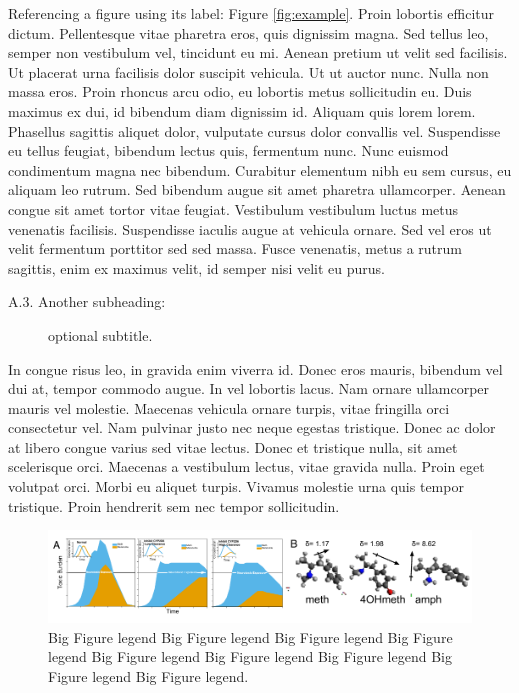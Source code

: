 \documentclass[11pt, notitlepage]{article} %
\begin{document}
Referencing a figure using its label: Figure \ref{fig:example}. Proin lobortis efficitur dictum. Pellentesque vitae pharetra eros, quis dignissim magna. Sed tellus leo, semper non vestibulum vel, tincidunt eu mi. Aenean pretium ut velit sed facilisis. Ut placerat urna facilisis dolor suscipit vehicula. Ut ut auctor nunc. Nulla non massa eros. Proin rhoncus arcu odio, eu lobortis metus sollicitudin eu. Duis maximus ex dui, id bibendum diam dignissim id. Aliquam quis lorem lorem. Phasellus sagittis aliquet dolor, vulputate cursus dolor convallis vel. Suspendisse eu tellus feugiat, bibendum lectus quis, fermentum nunc. Nunc euismod condimentum magna nec bibendum. Curabitur elementum nibh eu sem cursus, eu aliquam leo rutrum. Sed bibendum augue sit amet pharetra ullamcorper. Aenean congue sit amet tortor vitae feugiat. Vestibulum vestibulum luctus metus venenatis facilisis. Suspendisse iaculis augue at vehicula ornare. Sed vel eros ut velit fermentum porttitor sed sed massa. Fusce venenatis, metus a rutrum sagittis, enim ex maximus velit, id semper nisi velit eu purus.

\begin{description}
	\item[A.3. Another subheading:]{optional subtitle.}
\end{description}

In congue risus leo, in gravida enim viverra id. Donec eros mauris, bibendum vel dui at, tempor commodo augue. In vel lobortis lacus. Nam ornare ullamcorper mauris vel molestie. Maecenas vehicula ornare turpis, vitae fringilla orci consectetur vel. Nam pulvinar justo nec neque egestas tristique. Donec ac dolor at libero congue varius sed vitae lectus. Donec et tristique nulla, sit amet scelerisque orci. Maecenas a vestibulum lectus, vitae gravida nulla. Proin eget volutpat orci. Morbi eu aliquet turpis. Vivamus molestie urna quis tempor tristique. Proin hendrerit sem nec tempor sollicitudin.

\begin{figure}[b] %
	\centering
	\includegraphics[scale = .80]{Figures/Fig2.pdf}
	\caption{\footnotesize Big Figure legend Big Figure legend Big Figure legend Big Figure legend Big Figure legend Big Figure legend Big Figure legend Big Figure legend Big Figure legend.}
	\label{fig2}
\end{figure}
\end{document}
